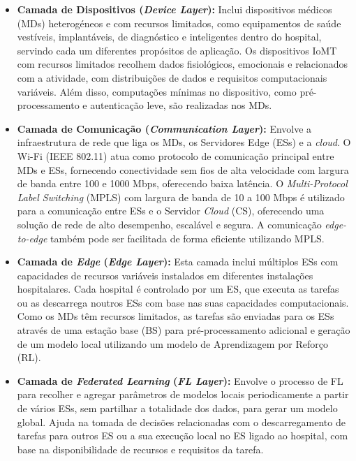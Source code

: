 \documentclass{llncs}
\begin{document}
\begin{itemize}
    \item \textbf{Camada de Dispositivos (\textit{Device Layer}):} Inclui dispositivos médicos (MDs) heterogéneos e com recursos limitados, como equipamentos de saúde vestíveis, implantáveis, de diagnóstico e inteligentes dentro do hospital, servindo cada um diferentes propósitos de aplicação. Os dispositivos IoMT com recursos limitados recolhem dados fisiológicos, emocionais e relacionados com a atividade, com distribuições de dados e requisitos computacionais variáveis. Além disso, computações mínimas no dispositivo, como pré-processamento e autenticação leve, são realizadas nos MDs.
    
    \item \textbf{Camada de Comunicação (\textit{Communication Layer}):} Envolve a infraestrutura de rede que liga os MDs, os Servidores Edge (ESs) e a \textit{cloud}. O Wi-Fi (IEEE 802.11) atua como protocolo de comunicação principal entre MDs e ESs, fornecendo conectividade sem fios de alta velocidade com largura de banda entre 100 e 1000 Mbps, oferecendo baixa latência. O \textit{Multi-Protocol Label Switching} (MPLS) com largura de banda de 10 a 100 Mbps é utilizado para a comunicação entre ESs e o Servidor \textit{Cloud} (CS), oferecendo uma solução de rede de alto desempenho, escalável e segura. A comunicação \textit{edge-to-edge} também pode ser facilitada de forma eficiente utilizando MPLS.
    
    \item \textbf{Camada de \textit{Edge} (\textit{Edge Layer}):} Esta camada inclui múltiplos ESs com capacidades de recursos variáveis instalados em diferentes instalações hospitalares. Cada hospital é controlado por um ES, que executa as tarefas ou as descarrega noutros ESs com base nas suas capacidades computacionais. Como os MDs têm recursos limitados, as tarefas são enviadas para os ESs através de uma estação base (BS) para pré-processamento adicional e geração de um modelo local utilizando um modelo de Aprendizagem por Reforço (RL).
    
    \item \textbf{Camada de \textit{Federated Learning} (\textit{FL Layer}):} Envolve o processo de FL para recolher e agregar parâmetros de modelos locais periodicamente a partir de vários ESs, sem partilhar a totalidade dos dados, para gerar um modelo global. Ajuda na tomada de decisões relacionadas com o descarregamento de tarefas para outros ES ou a sua execução local no ES ligado ao hospital, com base na disponibilidade de recursos e requisitos da tarefa.
    

\end{itemize}
\end{document}
